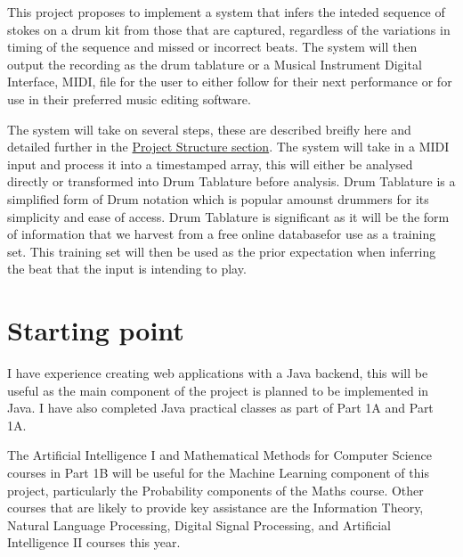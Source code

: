 \documentclass[12pt,a4]{article}
\begin{document}
This project proposes to implement a system that infers the inteded sequence of stokes on a drum kit from those that are captured, regardless of the variations in timing of the sequence and missed or incorrect beats. The system will then output the recording as the drum tablature or a Musical Instrument Digital Interface, MIDI, file for the user to either follow for their next performance or for use in their preferred music editing software.

The system will take on several steps, these are described breifly here and detailed further in the \hyperref[sec:ProjectStructure]{Project Structure section}. The system will take in a MIDI input and process it into a timestamped array, this will either be analysed directly or transformed into Drum Tablature before analysis. Drum Tablature is a simplified form of Drum notation which is popular amounst drummers for its simplicity and ease of access. Drum Tablature is significant as it will be the form of information that we harvest from a free online database\footnotemark[1] for use as a training set. This training set will then be used as the prior expectation when inferring the beat that the input is intending to play.



	\section{Starting point}
I have experience creating web applications with a Java backend, this will be useful as the main component of the project is planned to be implemented in Java. I have also completed Java practical classes as part of Part 1A and Part 1A.

The Artificial Intelligence I and Mathematical Methods for Computer Science courses in Part 1B will be useful for the Machine Learning component of this project, particularly the Probability components of the Maths course. Other courses that are likely to provide key assistance are the Information Theory, Natural Language Processing, Digital Signal Processing, and Artificial Intelligence II courses this year.
\end{document}

